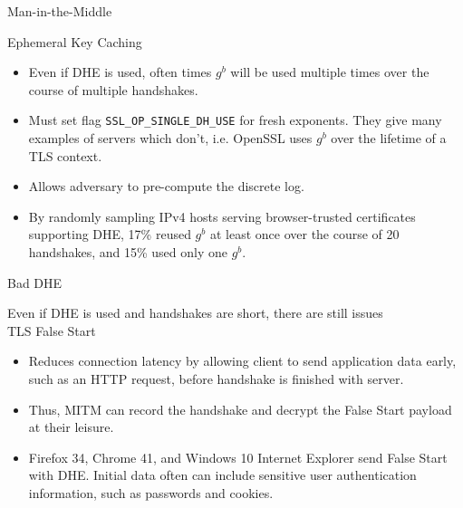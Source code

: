 \documentclass[presentation, aspectratio=54]{beamer}
\begin{document}

\begin{frame}{Man-in-the-Middle}

Ephemeral Key Caching
\begin{itemize}
\item Even if DHE is used, often times $g^b$ will be used multiple
      times over the course of multiple handshakes. 
\item Must set flag \texttt{SSL\_OP\_SINGLE\_DH\_USE} for fresh exponents.
      They give many examples of servers which don't, i.e. OpenSSL uses
      $g^b$ over the lifetime of a TLS context.
\item Allows adversary to pre-compute the discrete log.
\item By randomly sampling IPv4 hosts serving browser-trusted certificates
      supporting DHE, 17\% reused $g^b$ at least once over the
      course of 20 handshakes, and 15\% used only one $g^b$.
\end{itemize}

\end{frame}


\begin{frame}{Bad DHE}

Even if DHE is used and handshakes are short, there are still issues\\

TLS False Start
\begin{itemize}
\item Reduces connection latency by allowing client to send application data
      early, such as an HTTP request, before handshake is finished with server.
\item Thus, MITM can record the handshake and decrypt the False Start payload at
      their leisure.
\item Firefox 34, Chrome 41, and Windows 10 Internet Explorer send False Start
      with DHE. Initial data often can include sensitive user authentication
      information, such as passwords and cookies.
\end{itemize}

\end{frame}

\end{document}
